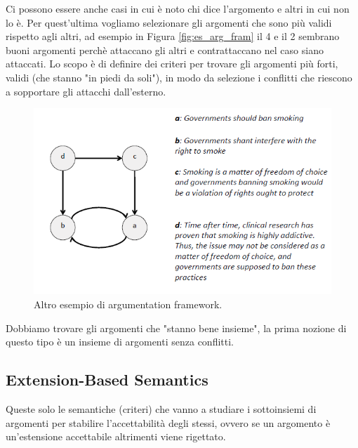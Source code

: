 Ci possono essere anche casi in cui è noto chi dice l'argomento e altri in cui non lo è. Per quest'ultima vogliamo selezionare gli argomenti che sono più validi rispetto agli altri, ad esempio in Figura \ref{fig:es_arg_fram} il 4 e il 2 sembrano buoni argomenti perchè attaccano gli altri e contrattaccano nel caso siano attaccati. Lo scopo è di definire dei criteri per trovare gli argomenti più forti, validi (che stanno "in piedi da soli"), in modo da selezione i conflitti che riescono a sopportare gli attacchi dall'esterno. 
\begin{figure}[H]
    \centering
    \includegraphics[width=13cm, keepaspectratio]{img/es_2_arg_fram.png}
    \caption{Altro esempio di argumentation framework.}\label{fig:es_2_arg_fram}
\end{figure}
Dobbiamo trovare gli argomenti che "stanno bene insieme", la prima nozione di questo tipo è un insieme di argomenti senza conflitti. 

\subsection{Extension-Based Semantics}
Queste solo le semantiche (criteri) che vanno a studiare i sottoinsiemi di argomenti per stabilire l'accettabilità degli stessi, ovvero se un argomento è un'estensione accettabile altrimenti viene rigettato.

